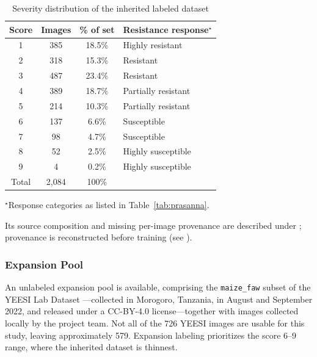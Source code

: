 \documentclass{icsthesis}
\newcommand{\secref}[1]{\textit{\nameref{#1}}}
\begin{document}
\begin{mainmatter}
					\begin{table}[htbp]
					\vspace{4ex}
					\centering
						\caption{Severity distribution of the inherited labeled dataset}
						\label{tab:inherited}
						\begin{tabular}{cccl}
						\hline
						\hline
						Score & Images & \% of set & Resistance response$^{\star}$ \\ \hline
						1 & 385 & 18.5\% & Highly resistant \\
						2 & 318 & 15.3\% & Resistant \\
						3 & 487 & 23.4\% & Resistant \\
						4 & 389 & 18.7\% & Partially resistant \\
						5 & 214 & 10.3\% & Partially resistant \\
						6 & 137 & 6.6\% & Susceptible \\
						7 & 98 & 4.7\% & Susceptible \\
						8 & 52 & 2.5\% & Highly susceptible \\
						9 & 4 & 0.2\% & Highly susceptible \\ \hline
						Total & 2,084 & 100\% & \\ \hline\hline
						\end{tabular}

						\vspace{1ex}
						\begin{minipage}{0.85\textwidth}
						\singlespacing\footnotesize
						$^{\star}$Response categories as listed in Table~\ref{tab:prasanna}.
						\end{minipage}
					\vspace{4ex}
					\end{table}

					Its source composition and missing per-image provenance are described under
					\secref{sec:leakage}; provenance is reconstructed before training (see
					\secref{sec:leakctrl}).

				\subsubsection{Expansion Pool}\label{sec:expansion}

					An unlabeled expansion pool is available, comprising the \texttt{maize\_faw}
					subset of the YEESI Lab Dataset \citep{fue2022}---collected in Morogoro,
					Tanzania, in August and September 2022, and released under a CC-BY-4.0
					license---together with images collected locally by the project team. Not all of
					the 726 YEESI images are usable for this study, leaving approximately 579.
					Expansion labeling prioritizes the score 6--9 range, where the inherited dataset
					is thinnest.


\end{mainmatter}
\end{document}
